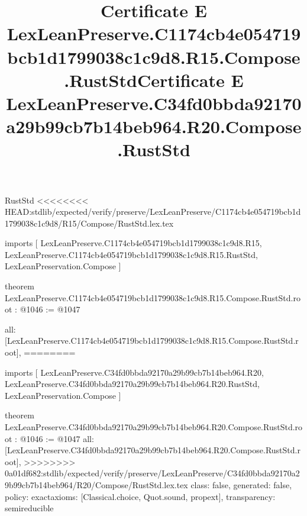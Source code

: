 \begin{lexlean}{RustStd}
<<<<<<<< HEAD:stdlib/expected/verify/preserve/LexLeanPreserve/C1174cb4e054719bcb1d1799038c1c9d8/R15/Compose/RustStd.lex.tex
\title{Certificate E LexLeanPreserve.C1174cb4e054719bcb1d1799038c1c9d8.R15.Compose.RustStd}
\begin{coremodule}
imports [
  LexLeanPreserve.C1174cb4e054719bcb1d1799038c1c9d8.R15,
  LexLeanPreserve.C1174cb4e054719bcb1d1799038c1c9d8.R15.RustStd,
  LexLeanPreservation.Compose
]

theorem LexLeanPreserve.C1174cb4e054719bcb1d1799038c1c9d8.R15.Compose.RustStd.root : @1046 := @1047 {
  all: [LexLeanPreserve.C1174cb4e054719bcb1d1799038c1c9d8.R15.Compose.RustStd.root],
========
\title{Certificate E LexLeanPreserve.C34fd0bbda92170a29b99cb7b14beb964.R20.Compose.RustStd}
\begin{coremodule}
imports [
  LexLeanPreserve.C34fd0bbda92170a29b99cb7b14beb964.R20,
  LexLeanPreserve.C34fd0bbda92170a29b99cb7b14beb964.R20.RustStd,
  LexLeanPreservation.Compose
]

theorem LexLeanPreserve.C34fd0bbda92170a29b99cb7b14beb964.R20.Compose.RustStd.root : @1046 := @1047 {
  all: [LexLeanPreserve.C34fd0bbda92170a29b99cb7b14beb964.R20.Compose.RustStd.root],
>>>>>>>> 0a01df682:stdlib/expected/verify/preserve/LexLeanPreserve/C34fd0bbda92170a29b99cb7b14beb964/R20/Compose/RustStd.lex.tex
  class: false,
  generated: false,
  policy: exact{axioms: [Classical.choice, Quot.sound, propext]},
  transparency: semireducible
}


\end{coremodule}}
\end{coremodule}
\end{lexlean}
